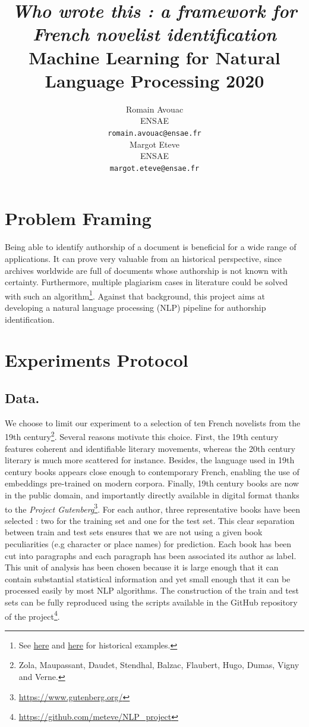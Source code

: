 \documentclass[11pt,a4paper]{article}
\title{\textit{Who wrote this : a framework for French novelist identification} \\
Machine Learning for Natural Language Processing 2020}
\author{Romain Avouac \\
  ENSAE  \\
  \texttt{romain.avouac@ensae.fr} \\\And
  Margot Eteve \\
  ENSAE \\
  \texttt{margot.eteve@ensae.fr} \\}
\date{}
\begin{document}
\maketitle

\section{Problem Framing}

Being able to identify authorship of a document is beneficial for a wide range of applications. It can prove very valuable from an historical perspective, since archives worldwide are full of documents whose authorship is not known with certainty. Furthermore, multiple plagiarism cases in literature could be solved with such an algorithm\footnote{See \href{https://en.wikipedia.org/wiki/Moli\%C3\%A8re_authorship_question}{here} and \href{https://en.wikipedia.org/wiki/Shakespeare_authorship_question}{here} for historical examples.}. Against that background, this project aims at developing a natural language processing (NLP) pipeline for authorship identification.

\section{Experiments Protocol}

\subsection{Data.} 

We choose to limit our experiment to a selection of ten French novelists from the 19th century\footnote{Zola, Maupassant, Daudet, Stendhal, Balzac, Flaubert, Hugo, Dumas, Vigny and Verne.}. Several reasons motivate this choice. First, the 19th century features coherent and identifiable literary movements, whereas the 20th century literary is much more scattered for instance. Besides, the language used in 19th century books appears close enough to contemporary French, enabling the use of embeddings pre-trained on modern corpora. Finally, 19th century books are now in the public domain, and importantly directly available in digital format thanks to the \textit{Project Gutenberg}\footnote{\url{https://www.gutenberg.org/}}. For each author, three representative books have been selected : two for the training set and one for the test set. This clear separation between train and test sets ensures that we are not using a given book peculiarities (e.g character or place names) for prediction. Each book has been cut into paragraphs and each paragraph has been associated its author as label. This unit of analysis has been chosen because it is large enough that it can contain substantial statistical information and yet small enough that it can be processed easily by most NLP algorithms. The construction of the train and test sets can be fully reproduced using the scripts available in the GitHub repository of the project\footnote{\url{https://github.com/meteve/NLP_project}}.
\end{document}

